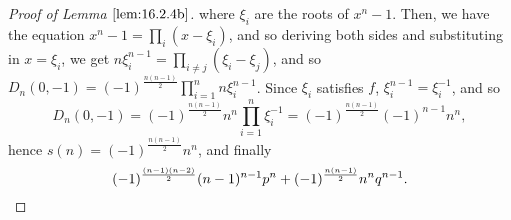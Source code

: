 \documentclass[12pt]{article}
\theoremstyle{remark}
\begin{document}
\begin{proof}[Proof of Lemma $\ref{lem:16.2.4b}$]
  where $\xi_i$ are the roots of $x^n-1$. Then, we have the equation $x^n-1 = \prod_i (x - \xi_i)$, and so deriving both sides and substituting in $x = \xi_i$, we get $n\xi_i^{n-1} = \prod_{i \ne j} (\xi_i - \xi_j)$, and so $D_n(0,-1) = (-1)^{\frac{n(n-1)}{2}}\prod_{i=1}^n n\xi_i^{n-1}$. Since $\xi_i$ satisfies $f$, $\xi_i^{n-1} = \xi_i^{-1}$, and so
  \begin{equation*}
    D_n(0,-1) = (-1)^{\frac{n(n-1)}{2}}n^n\prod_{i=1}^n \xi_i^{-1} = (-1)^{\frac{n(n-1)}{2}}(-1)^{n-1}n^n,
  \end{equation*}
  hence $s(n) = (-1)^{\frac{n(n-1)}{2}}n^n$, and finally
  \begin{equation*}
     (-1)^{\frac{(n-1)(n-2)}{2}}(n-1)^{n-1}p^n + (-1)^{\frac{n(n-1)}{2}}n^nq^{n-1}.\qedhere
  \end{equation*}
\end{proof}
\end{document}

